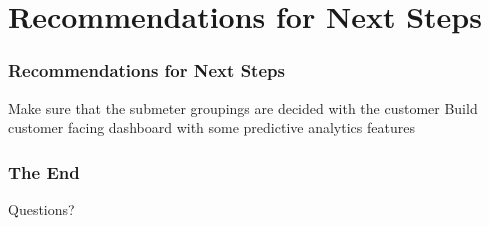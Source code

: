 \documentclass[10pt]{beamer}
\begin{document}
\section{Recommendations for Next Steps}


\begin{frame}
\frametitle{Recommendations for Next Steps}

Make sure that the submeter groupings are decided with the customer
Build customer facing dashboard with some predictive analytics features

\end{frame}

\begin{frame}
\frametitle{The End}

\LARGE{\centerline{Questions?}}

\end{frame}

\end{document}
